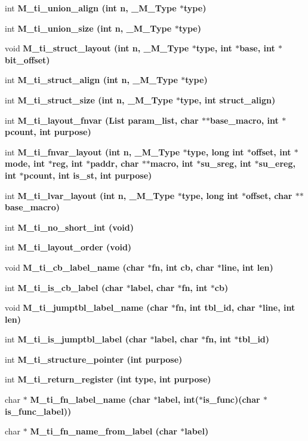 \begin{CompactItemize}
\item 
int \bf{M\_\-ti\_\-union\_\-align} (int n, \bf{\_\-M\_\-Type} $\ast$type)
\item 
int \bf{M\_\-ti\_\-union\_\-size} (int n, \bf{\_\-M\_\-Type} $\ast$type)
\item 
void \bf{M\_\-ti\_\-struct\_\-layout} (int n, \bf{\_\-M\_\-Type} $\ast$type, int $\ast$base, int $\ast$bit\_\-offset)
\item 
int \bf{M\_\-ti\_\-struct\_\-align} (int n, \bf{\_\-M\_\-Type} $\ast$type)
\item 
int \bf{M\_\-ti\_\-struct\_\-size} (int n, \bf{\_\-M\_\-Type} $\ast$type, int struct\_\-align)
\item 
int \bf{M\_\-ti\_\-layout\_\-fnvar} (\bf{List} param\_\-list, char $\ast$$\ast$base\_\-macro, int $\ast$pcount, int purpose)
\item 
int \bf{M\_\-ti\_\-fnvar\_\-layout} (int n, \bf{\_\-M\_\-Type} $\ast$type, long int $\ast$offset, int $\ast$\bf{mode}, int $\ast$reg, int $\ast$paddr, char $\ast$$\ast$macro, int $\ast$su\_\-sreg, int $\ast$su\_\-ereg, int $\ast$pcount, int is\_\-st, int purpose)
\item 
int \bf{M\_\-ti\_\-lvar\_\-layout} (int n, \bf{\_\-M\_\-Type} $\ast$type, long int $\ast$offset, char $\ast$$\ast$base\_\-macro)
\item 
int \bf{M\_\-ti\_\-no\_\-short\_\-int} (void)
\item 
int \bf{M\_\-ti\_\-layout\_\-order} (void)
\item 
void \bf{M\_\-ti\_\-cb\_\-label\_\-name} (char $\ast$fn, int cb, char $\ast$line, int len)
\item 
int \bf{M\_\-ti\_\-is\_\-cb\_\-label} (char $\ast$label, char $\ast$fn, int $\ast$cb)
\item 
void \bf{M\_\-ti\_\-jumptbl\_\-label\_\-name} (char $\ast$fn, int tbl\_\-id, char $\ast$line, int len)
\item 
int \bf{M\_\-ti\_\-is\_\-jumptbl\_\-label} (char $\ast$label, char $\ast$fn, int $\ast$tbl\_\-id)
\item 
int \bf{M\_\-ti\_\-structure\_\-pointer} (int purpose)
\item 
int \bf{M\_\-ti\_\-return\_\-register} (int type, int purpose)
\item 
char $\ast$ \bf{M\_\-ti\_\-fn\_\-label\_\-name} (char $\ast$label, int($\ast$is\_\-func)(char $\ast$is\_\-func\_\-label))
\item 
char $\ast$ \bf{M\_\-ti\_\-fn\_\-name\_\-from\_\-label} (char $\ast$label)
\item 
$$
\end{CompactItemize}
